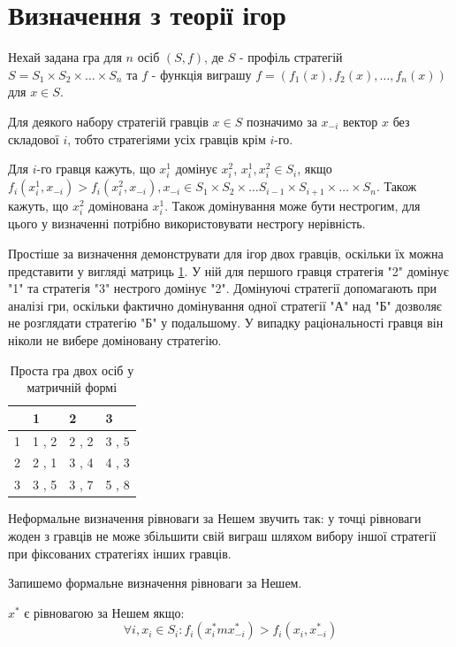 \section{Визначення з теорії ігор}

Нехай задана гра для $n$ осіб $(S,f)$, де $S$ - профіль стратегій $S=S_1 \times S_2 \times \ldots \times S_n$ та $f$ - функція виграшу $f=(f_1(x),f_2(x), \ldots, f_n(x))$ для $x \in S$.

Для деякого набору стратегій гравців $x \in S$ позначимо за $x_{-i}$ вектор $x$ без складової $i$, тобто стратегіями усіх гравців крім $i$-го.

Для $i$-го гравця кажуть, що $x^1_i$ домінує $x^2_i$, $x^1_i, x^2_i \in S_i$, якщо $f_i(x^1_i, x_{-i}) > f_i(x^2_i, x_{-i}), x_{-i} \in S_1 \times S_2 \times \ldots S_{i-1} \times S_{i+1} \times \ldots \times S_n$. Також кажуть, що $x^2_i$ домінована $x^1_i$. Також домінування може бути нестрогим, для цього у визначенні потрібно використовувати нестрогу нерівність.

Простіше за визначення демонструвати для ігор двох гравців, оскільки їх можна представити у вигляді матриць \ref{table:simple_game}. У ній для першого гравця стратегія "2" домінує "1" та стратегія "3" нестрого домінує "2". Домінуючі стратегії допомагають при аналізі гри, оскільки фактично домінування одної стратегії "А" над "Б" дозволяє не розглядати стратегію "Б" у подальшому. У випадку раціональності гравця він ніколи не вибере доміновану стратегію.

\begin{table}[H]
	\caption{Проста гра двох осіб у матричній формі}
	\label{table:simple_game}
	\centering
	\begin{tabular}{|p{1cm}|p{1cm}|p{1cm}|p{1cm}|}
		\hline
		        & 1     & 2     & 3
		\\ \hline
		1 		& 1 , 2 & 2 , 2 & 3 , 5
		\\ \hline
		2 		& 2 , 1 & 3 , 4 & 4 , 3
		\\ \hline
		3 		& 3 , 5 & 3 , 7 & 5 , 8
		\\ \hline
	\end{tabular}
\end{table}

Неформальне визначення рівноваги за Нешем звучить так: у точці рівноваги жоден з гравців не може збільшити свій виграш шляхом вибору іншої стратегії при фіксованих стратегіях інших гравців.

Запишемо формальне визначення рівноваги за Нешем.

$x^*$ є рівновагою за Нешем якщо:
\begin{equation}
	\forall i, x_i \in S_i : f_i(x^*_im x^*_{-i}) > f_i(x_i, x^*_{-i})	
	\label{eq:nash_equilibrium_def}
\end{equation}


